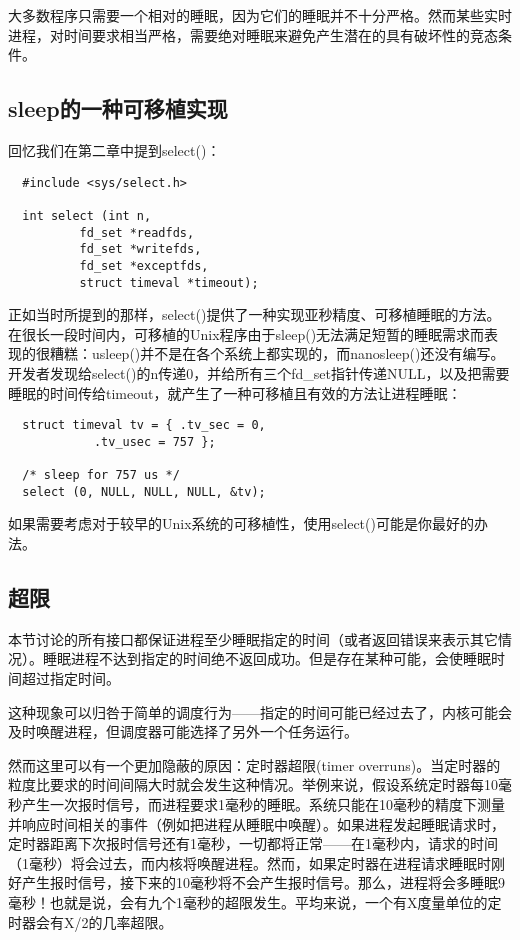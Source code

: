 大多数程序只需要一个相对的睡眠，因为它们的睡眠并不十分严格。然而某些实时进程，对时间要求相当严格，需要绝对睡眠来避免产生潜在的具有破坏性的竞态条件。 

\subsection{sleep的一种可移植实现}

回忆我们在第二章中提到select()： 

\begin{lstlisting}
  #include <sys/select.h>

  int select (int n,
	      fd_set *readfds,
	      fd_set *writefds,
	      fd_set *exceptfds,
	      struct timeval *timeout);
\end{lstlisting}

正如当时所提到的那样，select()提供了一种实现亚秒精度、可移植睡眠的方法。在很长一段时间内，可移植的Unix程序由于sleep()无法满足短暂的睡眠需求而表现的很糟糕：usleep()并不是在各个系统上都实现的，而nanosleep()还没有编写。开发者发现给select()的n传递0，并给所有三个fd\_set指针传递NULL，以及把需要睡眠的时间传给timeout，就产生了一种可移植且有效的方法让进程睡眠： 

\begin{lstlisting}
  struct timeval tv = { .tv_sec = 0,
			.tv_usec = 757 };

  /* sleep for 757 us */
  select (0, NULL, NULL, NULL, &tv);
\end{lstlisting}

如果需要考虑对于较早的Unix系统的可移植性，使用select()可能是你最好的办法。 

\subsection{超限}

本节讨论的所有接口都保证进程至少睡眠指定的时间（或者返回错误来表示其它情况）。睡眠进程不达到指定的时间绝不返回成功。但是存在某种可能，会使睡眠时间超过指定时间。

这种现象可以归咎于简单的调度行为——指定的时间可能已经过去了，内核可能会及时唤醒进程，但调度器可能选择了另外一个任务运行。

然而这里可以有一个更加隐蔽的原因：定时器超限(timer overruns)。当定时器的粒度比要求的时间间隔大时就会发生这种情况。举例来说，假设系统定时器每10毫秒产生一次报时信号，而进程要求1毫秒的睡眠。系统只能在10毫秒的精度下测量并响应时间相关的事件（例如把进程从睡眠中唤醒）。如果进程发起睡眠请求时，定时器距离下次报时信号还有1毫秒，一切都将正常——在1毫秒内，请求的时间（1毫秒）将会过去，而内核将唤醒进程。然而，如果定时器在进程请求睡眠时刚好产生报时信号，接下来的10毫秒将不会产生报时信号。那么，进程将会多睡眠9毫秒！也就是说，会有九个1毫秒的超限发生。平均来说，一个有X度量单位的定时器会有X/2的几率超限。

